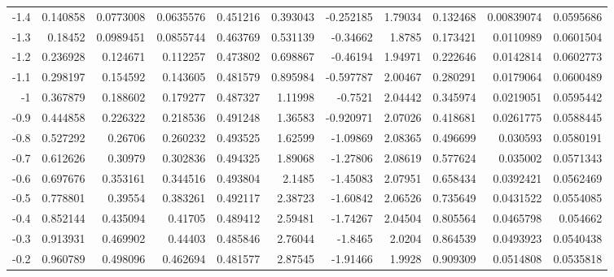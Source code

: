 {\begin{tabular}{rrrrrrrrrrr}
 -1.4         & 0.140858   & 0.0773008   &   0.0635576   &     0.451216  & 0.393043   &   -0.252185   &      1.79034  & 0.132468   &   0.00839074  &   0.0595686   \\
 -1.3         & 0.18452    & 0.0989451   &   0.0855744   &     0.463769  & 0.531139   &   -0.34662    &      1.8785   & 0.173421   &   0.0110989   &   0.0601504   \\
 -1.2         & 0.236928   & 0.124671    &   0.112257    &     0.473802  & 0.698867   &   -0.46194    &      1.94971  & 0.222646   &   0.0142814   &   0.0602773   \\
 -1.1         & 0.298197   & 0.154592    &   0.143605    &     0.481579  & 0.895984   &   -0.597787   &      2.00467  & 0.280291   &   0.0179064   &   0.0600489   \\
 -1           & 0.367879   & 0.188602    &   0.179277    &     0.487327  & 1.11998    &   -0.7521     &      2.04442  & 0.345974   &   0.0219051   &   0.0595442   \\
 -0.9         & 0.444858   & 0.226322    &   0.218536    &     0.491248  & 1.36583    &   -0.920971   &      2.07026  & 0.418681   &   0.0261775   &   0.0588445   \\
 -0.8         & 0.527292   & 0.26706     &   0.260232    &     0.493525  & 1.62599    &   -1.09869    &      2.08365  & 0.496699   &   0.030593    &   0.0580191   \\
 -0.7         & 0.612626   & 0.30979     &   0.302836    &     0.494325  & 1.89068    &   -1.27806    &      2.08619  & 0.577624   &   0.035002    &   0.0571343   \\
 -0.6         & 0.697676   & 0.353161    &   0.344516    &     0.493804  & 2.1485     &   -1.45083    &      2.07951  & 0.658434   &   0.0392421   &   0.0562469   \\
 -0.5         & 0.778801   & 0.39554     &   0.383261    &     0.492117  & 2.38723    &   -1.60842    &      2.06526  & 0.735649   &   0.0431522   &   0.0554085   \\
 -0.4         & 0.852144   & 0.435094    &   0.41705     &     0.489412  & 2.59481    &   -1.74267    &      2.04504  & 0.805564   &   0.0465798   &   0.054662    \\
 -0.3         & 0.913931   & 0.469902    &   0.44403     &     0.485846  & 2.76044    &   -1.8465     &      2.0204   & 0.864539   &   0.0493923   &   0.0540438   \\
 -0.2         & 0.960789   & 0.498096    &   0.462694    &     0.481577  & 2.87545    &   -1.91466    &      1.9928   & 0.909309   &   0.0514808   &   0.0535818   \\

\end{tabular}}
